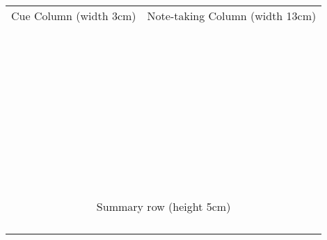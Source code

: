 \begin{tabular}{|p{3cm}||p{13cm}|}
\hline
Cue Column (width 3cm) & Note-taking Column (width 13cm) \\
&\\
&\\
&\\
&\\
&\\
&\\
&\\
&\\
&\\
&\\
&\\
&\\
&\\
&\\
&\\
&\\
&\\
&\\
&\\
&\\
&\\
&\\
&\\
&\\
&\\
&\\
&\\
&\\
&\\
&\\
&\\
&\\
&\\
&\\
&\\
&\\
&\\
&\\
&\\
&\\
&\\
\hline \hline
\multicolumn{2}{|c|}{Summary row (height 5cm)} \\
\multicolumn{2}{|c|}{} \\
\multicolumn{2}{|c|}{} \\
\multicolumn{2}{|c|}{} \\
\multicolumn{2}{|c|}{} \\
\hline
\end{tabular}
